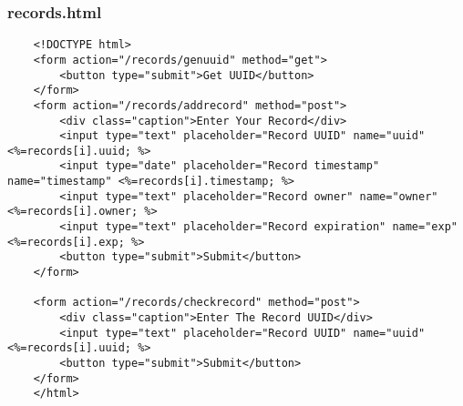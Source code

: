 \subsubsection{records.html}
\begin{lstlisting}
    <!DOCTYPE html>
    <form action="/records/genuuid" method="get">
        <button type="submit">Get UUID</button>
    </form>
    <form action="/records/addrecord" method="post"> 
        <div class="caption">Enter Your Record</div>
        <input type="text" placeholder="Record UUID" name="uuid" <%=records[i].uuid; %>
        <input type="date" placeholder="Record timestamp" name="timestamp" <%=records[i].timestamp; %>
        <input type="text" placeholder="Record owner" name="owner" <%=records[i].owner; %>
        <input type="text" placeholder="Record expiration" name="exp" <%=records[i].exp; %>
        <button type="submit">Submit</button>
    </form>
    
    <form action="/records/checkrecord" method="post"> 
        <div class="caption">Enter The Record UUID</div>
        <input type="text" placeholder="Record UUID" name="uuid" <%=records[i].uuid; %>
        <button type="submit">Submit</button>
    </form>
    </html>    
\end{lstlisting}


